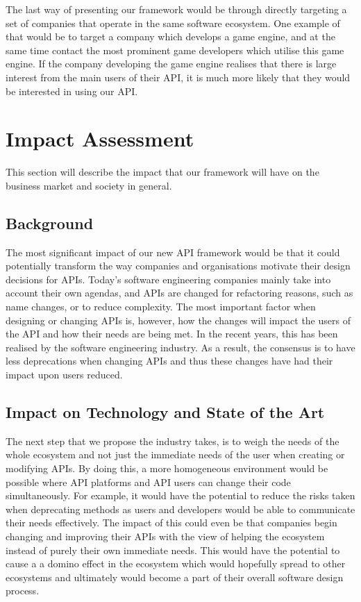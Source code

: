 \documentclass{article}
\begin{document}
The last way of presenting our framework would be through directly targeting a set of companies that operate in the same software ecosystem. One example of that would be to target a company which develops a game engine, and at the same time contact the most prominent game developers which utilise this game engine. If the company developing the game engine realises that there is large interest from the main users of their API, it is much more likely that they would be interested in using our API. 


\section{Impact Assessment}
This section will describe the impact that our framework will have on the business market and society in general. 

\subsection{Background}
The most significant impact of our new API framework would be that it could potentially transform the way companies and organisations motivate their design decisions for APIs. Today's software engineering companies mainly take into account their own agendas, and APIs are changed for refactoring reasons, such as name changes, or to reduce complexity. The most important factor when designing or changing APIs is, however, how the changes will impact the users of the API and how their needs are being met. In the recent years, this has been realised by the software engineering industry. As a result, the consensus is to have less deprecations when changing APIs and thus these changes have had their impact upon users reduced. 

\subsection{Impact on Technology and State of the Art}
The next step that we propose the industry takes, is to weigh the needs of the whole ecosystem and not just the immediate needs of the user when creating or modifying APIs. By doing this, a more homogeneous environment would be possible where API platforms and API users can change their code simultaneously. For example, it would have the potential to reduce the risks taken when deprecating methods as users and developers would be able to communicate their needs effectively. The impact of this could even be that companies begin changing and improving their APIs with the view of helping the ecosystem instead of purely their own immediate needs. This would have the potential to cause a a domino effect in the ecosystem which would hopefully spread to other ecosystems and ultimately would become a part of their overall software design process. 
\end{document}
